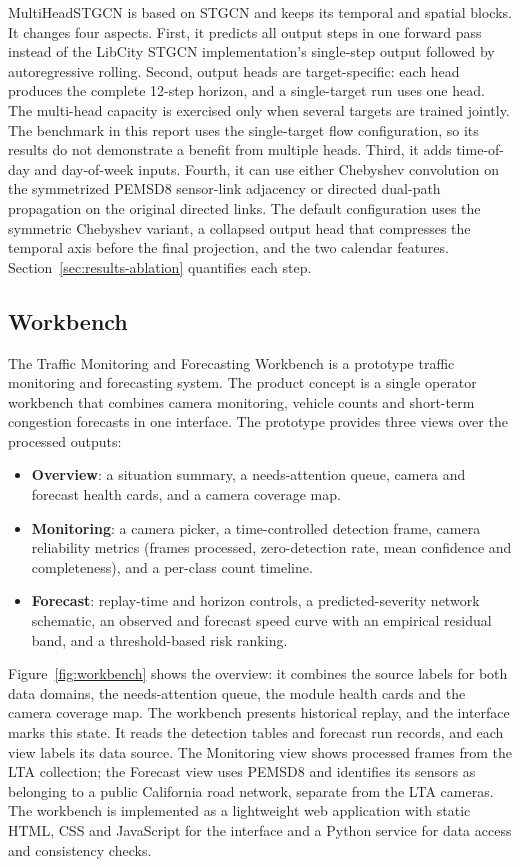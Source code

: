 MultiHeadSTGCN is based on STGCN and keeps its temporal and spatial blocks. It
changes four aspects. First, it predicts all output steps in one forward pass
instead of the LibCity STGCN implementation's single-step output followed by
autoregressive rolling. Second,
output heads are target-specific: each head produces the complete 12-step
horizon, and a single-target run uses one head. The multi-head capacity is
exercised only when several targets are trained jointly. The benchmark in this
report uses the single-target flow configuration, so its results do not
demonstrate a benefit from multiple heads. Third, it adds time-of-day and
day-of-week inputs. Fourth, it can use either Chebyshev convolution on the
symmetrized PEMSD8 sensor-link adjacency or directed dual-path propagation on
the original directed links. The default configuration uses the symmetric
Chebyshev variant, a collapsed output head that compresses the temporal axis
before the final projection, and the two calendar features.
Section~\ref{sec:results-ablation} quantifies each step.

\subsection{Workbench}\label{sec:method-workbench}

The Traffic Monitoring and Forecasting Workbench is a prototype traffic
monitoring and forecasting system. The product concept is a single operator
workbench that combines camera monitoring, vehicle counts and short-term
congestion forecasts in one interface. The prototype provides three views over
the processed outputs:

\begin{itemize}
  \item \textbf{Overview}: a situation summary, a needs-attention queue, camera
        and forecast health cards, and a camera coverage map.
  \item \textbf{Monitoring}: a camera picker, a time-controlled detection frame,
        camera reliability metrics (frames processed, zero-detection rate, mean
        confidence and completeness), and a per-class count timeline.
  \item \textbf{Forecast}: replay-time and horizon controls, a predicted-severity
        network schematic, an observed and forecast speed curve with an empirical
        residual band, and a threshold-based risk ranking.
\end{itemize}

Figure~\ref{fig:workbench} shows the overview: it combines the source labels for
both data domains, the needs-attention queue, the module health cards and the
camera coverage map. The workbench presents historical replay, and the interface
marks this state. It reads the detection tables and forecast run records, and each view labels
its data source. The Monitoring view shows
processed frames from the LTA collection; the Forecast view uses PEMSD8 and
identifies its sensors as belonging to a public California road network,
separate from the LTA cameras. The workbench is implemented as a lightweight web
application with static HTML, CSS and JavaScript for the interface and a Python
service for data access and consistency checks.

